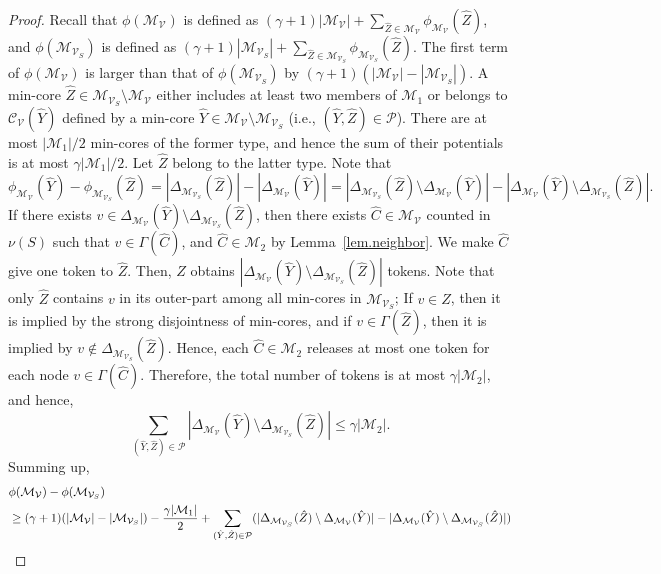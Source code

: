 \documentclass[11pt]{article}
\newcommand{\Mfam}{\mathcal{M}}
\newcommand{\Cfam}{\mathcal{C}}
\newcommand{\Vfam}{\mathcal{V}}
\newcommand{\Pfam}{\mathcal{P}}
\begin{document}
\begin{proof}
 Recall that
 $\phi(\Mfam_{\Vfam})$ is defined as $(\gamma+1)|\Mfam_{\Vfam}|+\sum_{\hat{Z} \in
 \Mfam_{\Vfam}}\phi_{\Mfam_{\Vfam}}(\hat{Z})$,
 and 
 $\phi(\Mfam_{\Vfam_S})$ is defined as 
 $(\gamma+1)|\Mfam_{\Vfam_S}|+\sum_{\hat{Z} \in \Mfam_{\Vfam_S}}\phi_{\Mfam_{\Vfam_S}}(\hat{Z})$.
 The first term of $\phi(\Mfam_{\Vfam})$
 is larger than that of $\phi(\Mfam_{\Vfam_S})$ by $(\gamma+1)(|\Mfam_{\Vfam}|-|\Mfam_{\Vfam_S}|)$.
 A min-core $\hat{Z} \in \Mfam_{\Vfam_S}\setminus \Mfam_{\Vfam}$ either includes at least two members of
 $\Mfam_1$ or belongs to $\Cfam_{\Vfam}(\hat{Y})$ defined by a
 min-core $\hat{Y} \in \Mfam_{\Vfam}\setminus \Mfam_{\Vfam_S}$ (i.e., $(\hat{Y},\hat{Z})
 \in \Pfam$).
 There are at most $|\Mfam_1|/2$ min-cores of the former type, and hence
 the sum of their potentials is at most $\gamma |\Mfam_1|/2$.
 Let $\hat{Z}$ belong to the latter type. 
 Note that
 \[
  \phi_{\Mfam_{\Vfam}}(\hat{Y})-\phi_{\Mfam_{\Vfam_S}}(\hat{Z})
 = |\Delta_{\Mfam_{\Vfam_S}}(\hat{Z})|-|\Delta_{\Mfam_{\Vfam}}(\hat{Y})|
 =
 |\Delta_{\Mfam_{\Vfam_S}}(\hat{Z})\setminus \Delta_{\Mfam_{\Vfam}}(\hat{Y})|-
 |\Delta_{\Mfam_{\Vfam}}(\hat{Y})\setminus
 \Delta_{\Mfam_{\Vfam_S}}(\hat{Z})|.
\]
 If there exists $v \in \Delta_{\Mfam_{\Vfam}}(\hat{Y})\setminus \Delta_{\Mfam_{\Vfam_S}}(\hat{Z})$,
 then there exists $\hat{C} \in \Mfam_{\Vfam}$ counted in $\nu(S)$ such that $v
 \in \Gamma(\hat{C})$, and $\hat{C} \in \Mfam_2$ by Lemma~\ref{lem.neighbor}. 
 We make $\hat{C}$ give one token to $\hat{Z}$.
 Then, $\hat{Z}$ obtains $|\Delta_{\Mfam_{\Vfam}}(\hat{Y})\setminus
 \Delta_{\Mfam_{\Vfam_S}}(\hat{Z})|$ tokens. 
 Note that only $\hat{Z}$ contains $v$ in its
 outer-part among all min-cores in $\Mfam_{\Vfam_S}$;
 If $v \in Z$, then
 it is implied by the strong disjointness of min-cores, and 
 if $v \in \Gamma(\hat{Z})$, then it is implied by $v \not\in
 \Delta_{\Mfam_{\Vfam_S}}(\hat{Z})$.
 Hence, each $\hat{C} \in \Mfam_2$ releases at most
 one token for each node $v \in \Gamma(\hat{C})$.
Therefore, the total number of tokens is at most $\gamma|\Mfam_2|$, and
hence,
\[
 \sum_{(\hat{Y},\hat{Z}) \in \Pfam}
 |\Delta_{\Mfam_{\Vfam}}(\hat{Y})\setminus \Delta_{\Mfam_{\Vfam_S}}(\hat{Z})|
 \leq \gamma |\Mfam_2|.
\]
 Summing up, 
\begin{align}
 &\phi(\Mfam_{\Vfam})-\phi(\Mfam_{\Vfam_S})\notag\\
 &\geq  (\gamma+1)(|\Mfam_{\Vfam}|-|\Mfam_{\Vfam_S}|) - \frac{\gamma |\Mfam_1|}{2}
  +
  \sum_{(\hat{Y},\hat{Z}) \in \Pfam}(
 |\Delta_{\Mfam_{\Vfam_S}}(\hat{Z})\setminus \Delta_{\Mfam_{\Vfam}}(\hat{Y})|-
 |\Delta_{\Mfam_{\Vfam}}(\hat{Y})\setminus \Delta_{\Mfam_{\Vfam_S}}(\hat{Z})|)

\end{align}
\end{proof}
\end{document}
